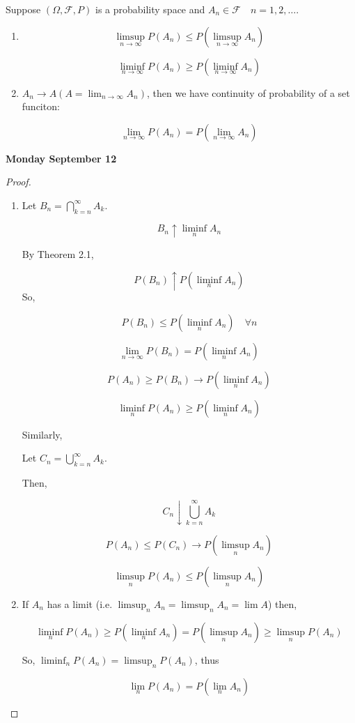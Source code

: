 \documentclass[11pt,fleqn]{book} %
\begin{document}
	 \begin{theorem}
	 	Suppose $(\Omega, \mathcal{F}, P)$ is a probability space and $A_n \in \mathcal{F} 	\quad n= 1, 2, \dots$.

	 	\begin{enumerate}[label = (\roman*)]
	 	 	\item $$\limsup_{n \rightarrow \infty} P( A_n) \leq P(\limsup_{n \rightarrow \infty} A_n) $$

	 	 	$$ \liminf_{n \rightarrow \infty} P( A_n) \geq P(\liminf_{n \rightarrow \infty} A_n)$$

	 	 	\item $A_n \rightarrow A (A = \lim_{n \rightarrow \infty} A_n)$, then we have continuity of probability of a set funciton: 

	 	 	$$\lim_{n \rightarrow \infty} P(A_n) = P (\lim_{n \rightarrow \infty} A_n) $$
	 	 \end{enumerate} 
	 \end{theorem}


\textbf{Monday September 12}

\begin{proof}
	\begin{enumerate}[label = (\roman*)]
		\item Let $B_n = \bigcap^\infty_{k=n} A_k$. 

			$$B_n \uparrow \liminf_{n } A_n $$

			By Theorem 2.1,  

			$$P(B_n) \uparrow P(\liminf_{n } A_n) $$
			So, 

			$$P(B_n) \leq P(\liminf_{n } A_n) \quad \forall n $$

			$$\lim_{n \rightarrow \infty} P(B_n)  = P(\liminf_{n} A_n)$$

			$$P(A_n) \geq P(B_n) \rightarrow P(\liminf_n A_n) $$

			$$\liminf_n P(A_n) \geq P(\liminf_{n} A_n)$$

			Similarly, 

			Let $C_n = \bigcup^\infty_{k=n} A_k$. 

			Then, 

			$$ C_n \downarrow \bigcup^\infty_{k=n} A_k$$

			$$P(A_n) \leq P(C_n) \rightarrow P(\limsup_{n } A_n) $$

			$$ \limsup_{n }P( A_n) \leq  P(\limsup_{n } A_n)$$

			\item If $A_n$ has a limit (i.e. $\limsup_n A_n = \limsup_n A_n = \lim A$) then,

			$$\liminf_n P(A_n) \geq P(\liminf_n A_n) = P(\limsup_n A_n) \geq \limsup_n P(A_n) $$

			So, $\liminf_n P(A_n) = \limsup_n P(A_n)$, thus

			$$\lim_n P(A_n) = P(\lim_n A_n) $$

	\end{enumerate}
\end{proof}
\end{document}
